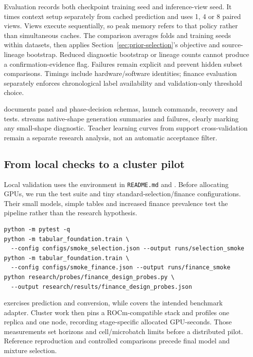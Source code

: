 \documentclass[11pt]{article}
\begin{document}
Evaluation records both checkpoint training seed and inference-view seed. It times context setup separately from cached prediction and uses 1, 4 or 8 paired views. Views execute sequentially, so peak memory refers to that policy rather than simultaneous caches. The comparison averages folds and training seeds within datasets, then applies Section~\ref{sec:prior-selection}'s objective and source-lineage bootstrap. Reduced diagnostic bootstrap or lineage counts cannot produce a confirmation-evidence flag. Failures remain explicit and prevent hidden subset comparisons. Timings include hardware/software identities; finance evaluation separately enforces chronological label availability and validation-only threshold choice.

 documents panel and phase-decision schemas, launch commands, recovery and tests.  streams native-shape generation summaries and failures, clearly marking any small-shape diagnostic. Teacher learning curves from support cross-validation remain a separate research analysis, not an automatic acceptance filter.

\subsection{From local checks to a cluster pilot}

Local validation uses the environment in \texttt{README.md} and . Before allocating GPUs, we run the test suite and tiny standard-selection/finance configurations. Their small models, simple tables and increased finance prevalence test the pipeline rather than the research hypothesis.

\begin{lstlisting}
python -m pytest -q
python -m tabular_foundation.train \
  --config configs/smoke_selection.json --output runs/selection_smoke
python -m tabular_foundation.train \
  --config configs/smoke_finance.json --output runs/finance_smoke
python research/probes/finance_design_probes.py \
  --output research/results/finance_design_probes.json
\end{lstlisting}



 exercises prediction and conversion, while  covers the intended benchmark adapter. Cluster work then pins a ROCm-compatible stack and profiles one replica and one node, recording stage-specific allocated GPU-seconds. Those measurements set horizons and cell/microbatch limits before a distributed pilot. Reference reproduction and controlled comparisons precede final model and mixture selection.
\end{document}
